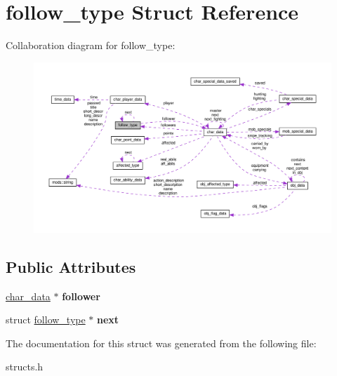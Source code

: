 \hypertarget{structfollow__type}{}\section{follow\+\_\+type Struct Reference}
\label{structfollow__type}


Collaboration diagram for follow\+\_\+type\+:
\nopagebreak
\begin{figure}[H]
\begin{center}
\leavevmode
\includegraphics[width=350pt]{structfollow__type__coll__graph}
\end{center}
\end{figure}
\subsection*{Public Attributes}
\begin{DoxyCompactItemize}
\item 
\mbox{\label{structfollow__type_a2272a8a5b6030d5fea471360f511b8c9}} 
\hyperlink{structchar__data}{char\+\_\+data} $\ast$ {\bfseries follower}
\item 
\mbox{\label{structfollow__type_a195302dad037e323a75d31e95e495203}} 
struct \hyperlink{structfollow__type}{follow\+\_\+type} $\ast$ {\bfseries next}
\end{DoxyCompactItemize}


The documentation for this struct was generated from the following file\+:\begin{DoxyCompactItemize}
\item 
structs.\+h\end{DoxyCompactItemize}
